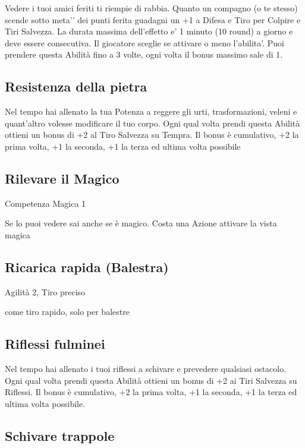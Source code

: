 \documentclass[a4paper,11pt,twoside,openany]{book}
\begin{document}
Vedere i tuoi amici feriti ti riempie di rabbia.
Quanto un compagno (o te stesso) scende sotto meta'’ dei punti ferita guadagni un +1 a Difesa e Tiro per Colpire e Tiri Salvezza. La durata massima dell’effetto e’ 1 minuto (10 round) a giorno e deve essere consecutiva. Il giocatore sceglie se attivare o meno l’abilita’.
Puoi prendere questa Abilità fino a 3 volte, ogni volta il bonus massimo sale di 1.

\subsection{Resistenza della pietra}

Nel tempo hai allenato la tua Potenza a reggere gli urti, trasformazioni, veleni e quant'altro volesse modificare il tuo corpo. Ogni qual volta prendi questa Abilità ottieni un bonus di +2 al Tiro Salvezza su Tempra. Il bonus è cumulativo, +2 la prima volta, +1 la seconda, +1 la terza ed ultima volta possibile

\subsection{Rilevare il Magico}

Competenza Magica 1

Se lo puoi vedere sai anche se è magico. Costa una Azione attivare la vista magica

\subsection{Ricarica rapida (Balestra)}

Agilità 2, Tiro preciso

come tiro rapido, solo per balestre

\subsection{Riflessi fulminei}

Nel tempo hai allenato i tuoi riflessi a schivare e prevedere qualsiasi ostacolo. Ogni qual volta prendi questa Abilità ottieni un bonus di +2 ai Tiri Salvezza su Riflessi. Il bonus è cumulativo, +2 la prima volta, +1 la seconda, +1 la terza ed ultima volta possibile.

\subsection{Schivare trappole}
\end{document}
